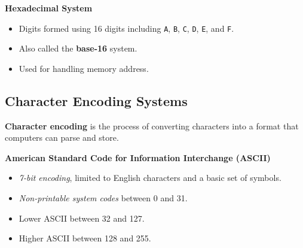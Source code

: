 \documentclass[12pt, letterpaper]{article}
\begin{document}
\textbf{Hexadecimal System}

\begin{itemize}
    \item Digits formed using 16 digits including \texttt{A}, \texttt{B}, \texttt{C}, \texttt{D}, \texttt{E}, and \texttt{F}.
    \item Also called the \textbf{base-16} system.
    \item Used for handling memory address.
\end{itemize}

\subsection*{Character Encoding Systems}

\textbf{Character encoding} is the process of converting characters into a format that computers can parse and store.
\medskip

\textbf{American Standard Code for Information Interchange (ASCII)}
    \begin{itemize}
        \item \textit{7-bit encoding}, limited to English characters and a basic set of symbols.
        \item \textit{Non-printable system codes} between 0 and 31.
        \item Lower ASCII between 32 and 127.
        \item Higher ASCII between 128 and 255.
    \end{itemize}
\end{document}
